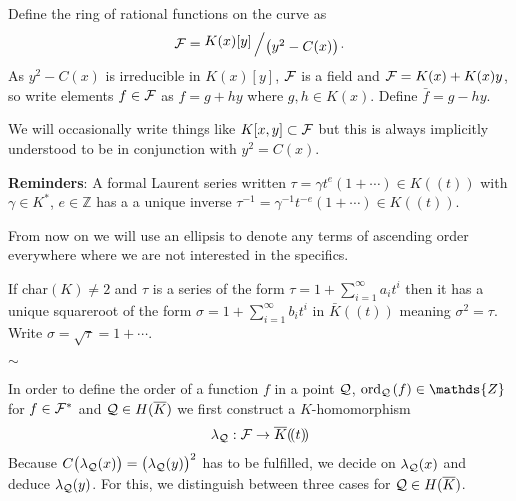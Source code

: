 \documentclass[english,11pt,a4paper]{article}
\begin{document}
\begin{defin}
  Define the ring of rational functions on the curve as
  \begin{align*}
    \F = \bigslant{K(x)[y]}{\big(y^2-C(x)\big)}.
  \end{align*}
  As $y^2-C(x)$ is irreducible in $K(x)[y]$, $\mathcal{F}$ is a field
  and $\mathcal{F} = K(x) + K(x) y$, so write elements $f \in \mathcal{F}$ as $f = g + hy$ where $g,h \in K(x)$. Define $\bar f = g - hy$.

  We will occasionally write things like $K[x,y] \subset \mathcal{F}$ but this is always implicitly understood to be in conjunction with $y^2=C(x)$.
\end{defin}

\vspace{3mm}

\textbf{Reminders}: A formal Laurent series written $\tau = \gamma t^e (1 + \cdots)\in K (\! (t)\! )$ with $\gamma \in K^*$, $e \in \mathds{Z}$ has a a unique inverse $\tau^{-1} = \gamma^{-1} t^{-e} (1 + \cdots) \in K (\! (t)\! )$.

From now on we will use an ellipsis to denote any terms of ascending order everywhere where we are not interested in the specifics.

If char$(K) \neq 2$ and $\tau$ is a series of the form $\tau = 1 + \sum_{i = 1}^{\infty} a_i t^i$ then it has a unique squareroot of the form $\sigma = 1+\sum_{i = 1}^{\infty} b_i t^i$ in $\bar K (\! (t)\! )$ meaning $\sigma^2 = \tau$. Write $\sigma = \sqrt \tau = 1 + \cdots$.

\vspace{-3mm}
\begin{center}
$\sim$
\end{center}

In order to define the order of a function $f$ in a point $\mathcal{Q}$, $\ordq (f) \in \mathds{Z}$ for $f \in \mathcal{F}^*$ and $\mathcal{Q} \in H(\overline K)$ we first construct a $K$-homomorphism
\begin{align*}
  \lambda_{\mathcal{Q}}: \mathcal{F} \rightarrow \overline K (\! (t)\! )
\end{align*}
Because $C\big(\lambda_{\mathcal{Q}}(x)\big)=\big(\lambda_{\mathcal{Q}}(y)\big)^2$ has to be fulfilled, we decide on $\lambda_{\mathcal{Q}}(x)$ and deduce $\lambda_{\mathcal{Q}}(y)$. For this, we distinguish between three cases for $\mathcal{Q} \in H(\overline K)$.
\end{document}
